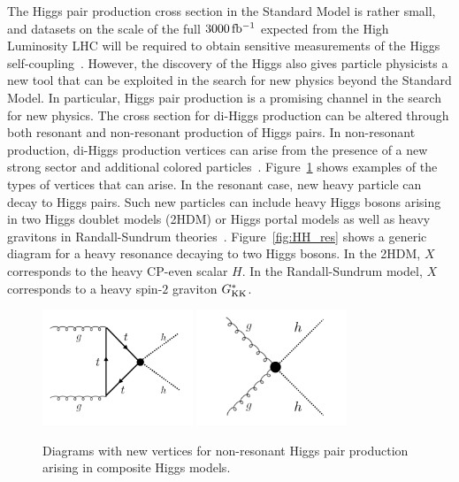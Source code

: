 The Higgs pair production cross section in the Standard Model is rather small, and datasets on the scale of the full $3000 \mbox{\,fb$^{-1}$}$ expected from the High Luminosity LHC will be required to obtain sensitive measurements of the Higgs self-coupling~\cite{HH_LHC}. However, the discovery of the Higgs also gives particle physicists a new tool that can be exploited in the search for new physics beyond the Standard Model. In particular, Higgs pair production is a promising channel in the search for new physics. The cross section for di-Higgs production can be altered through both resonant and non-resonant production of Higgs pairs. In non-resonant production, di-Higgs production vertices can arise from the presence of a new strong sector and additional colored particles~\cite{HH_NewPhys,AnomalousHHVertex,CompositeDiHiggs}. Figure~\ref{fig:HH_nonres} shows examples of the types of vertices that can arise. In the resonant case, new heavy particle can decay to Higgs pairs. Such new particles can include heavy Higgs bosons arising in two Higgs doublet models (2HDM) or Higgs portal models as well as heavy gravitons in Randall-Sundrum theories~\cite{HH_NewPhys,RSG1,RSG_LHC,RSG_LHC2,HH_2HDM,2HDM2,2HDM3,HiggsPortal}. Figure~\ref{fig:HH_res} shows a generic diagram for a heavy resonance decaying to two Higgs bosons. In the 2HDM, $X$ corresponds to the heavy CP-even scalar $H$. In the Randall-Sundrum model, $X$ corresponds to a heavy spin-$2$ graviton $G^*_{\rm KK}$. 
%
\begin{figure}[h!]
  \centering
  \captionsetup{justification=centering}

  \includegraphics[width=0.4\textwidth]{figures/HH_nonres1}
  \includegraphics[width=0.4\textwidth]{figures/HH_nonres2}
   \caption{Diagrams with new vertices for non-resonant Higgs pair production arising in composite Higgs models.}
  \label{fig:HH_nonres}
\end{figure}
